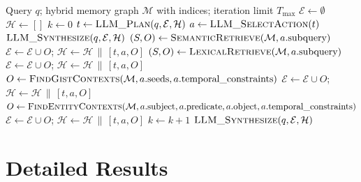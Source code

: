\documentclass{article} %
\begin{document}
\begin{algorithm}[tb]
\caption{AgenticInference$(q,\mathcal{M}, T_{\max})$}
\label{alg:react_infer}
\begin{algorithmic}[1]
\Require Query $q$; hybrid memory graph $\mathcal{M}$ with indices; iteration limit $T_{\max}$
\State $\mathcal{E} \gets \emptyset$ 
\State $\mathcal{H} \gets []$ 
\State $k \gets 0$ 
  \State $t \gets \textsc{LLM\_Plan}(q, \mathcal{E}, \mathcal{H})$ 
  \State $a \gets \textsc{LLM\_SelectAction}(t)$
      \State \Return $\textsc{LLM\_Synthesize}(q,\mathcal{E},\mathcal{H})$ 
      \State $(S, O) \gets \textsc{SemanticRetrieve}(\mathcal{M}, a.\text{subquery})$ 
      \State $\mathcal{E} \gets \mathcal{E} \cup O$; $\mathcal{H} \gets \mathcal{H} \,\|\, [t, a, O]$
      \State $(S, O) \gets \textsc{LexicalRetrieve}(\mathcal{M}, a.\text{subquery})$ 
      \State $\mathcal{E} \gets \mathcal{E} \cup O$; $\mathcal{H} \gets \mathcal{H} \,\|\, [t, a, O]$
      \State $O \gets \textsc{FindGistContexts}(\mathcal{M}, a.\text{seeds}, a.\text{temporal\_constraints})$
      \State $\mathcal{E} \gets \mathcal{E} \cup O$; $\mathcal{H} \gets \mathcal{H} \,\|\, [t, a, O]$
      \State $O \gets \textsc{FindEntityContexts}(\mathcal{M}, a.\text{subject}, a.\text{predicate}, a.\text{object}, a.\text{temporal\_constraints})$ 
      \State $\mathcal{E} \gets \mathcal{E} \cup O$; $\mathcal{H} \gets \mathcal{H} \,\|\, [t, a, O]$
  \EndIf
  \State $k \gets k + 1$
\EndWhile
\State \Return $\textsc{LLM\_Synthesize}(q,\mathcal{E},\mathcal{H})$ 
\end{algorithmic}
\end{algorithm}




\section{Detailed Results}
\end{document}
